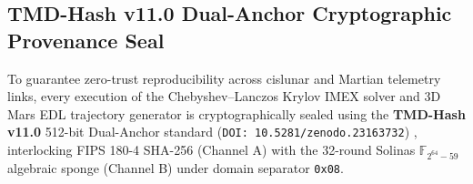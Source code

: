 \documentclass[11pt,a4paper,reqno]{article}
\theoremstyle{definition}
\theoremstyle{remark}
\begin{document}
\subsection{TMD-Hash v11.0 Dual-Anchor Cryptographic Provenance Seal}
To guarantee zero-trust reproducibility across cislunar and Martian telemetry links, every execution of the Chebyshev--Lanczos Krylov IMEX solver and 3D Mars EDL trajectory generator is cryptographically sealed using the \textbf{TMD-Hash v11.0} 512-bit Dual-Anchor standard (\texttt{DOI: 10.5281/zenodo.23163732}) \cite{ananda2026tmd_hash_v11}, interlocking FIPS 180-4 SHA-256 (Channel A) with the 32-round Solinas $\mathbb{F}_{2^{64}-59}$ algebraic sponge (Channel B) under domain separator \texttt{0x08}.

\end{document}
